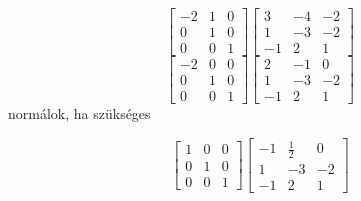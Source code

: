 \documentclass[12pt]{article}
\begin{document}
$$\left[{\begin{array}{ccc}-2& 1& 0\\ 0& 1& 0\\ 0& 0& 1\end{array}}\right]\left[{\begin{array}{ccc}3& -4& -2\\ 1& -3& -2\\ -1& 2& 1\end{array}}\right]$$
$$\left[{\begin{array}{ccc}-2& 0& 0\\ 0& 1& 0\\ 0& 0& 1\end{array}}\right]\left[{\begin{array}{ccc}2& -1& 0\\ 1& -3& -2\\ -1& 2& 1\end{array}}\right]$$
normálok, ha szükséges

$$\left[{\begin{array}{ccc}1& 0& 0\\ 0& 1& 0\\ 0& 0& 1\end{array}}\right]\left[{\begin{array}{ccc}-1& \frac{1}{2}& 0\\ 1& -3& -2\\ -1& 2& 1\end{array}}\right]$$
\end{document}
